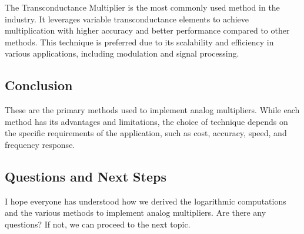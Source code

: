 The Transconductance Multiplier is the most commonly used method in the industry. It leverages variable transconductance elements to achieve multiplication with higher accuracy and better performance compared to other methods. This technique is preferred due to its scalability and efficiency in various applications, including modulation and signal processing.

\subsection*{Conclusion}

These are the primary methods used to implement analog multipliers. While each method has its advantages and limitations, the choice of technique depends on the specific requirements of the application, such as cost, accuracy, speed, and frequency response.

\subsection*{Questions and Next Steps}

I hope everyone has understood how we derived the logarithmic computations and the various methods to implement analog multipliers. Are there any questions? If not, we can proceed to the next topic.

